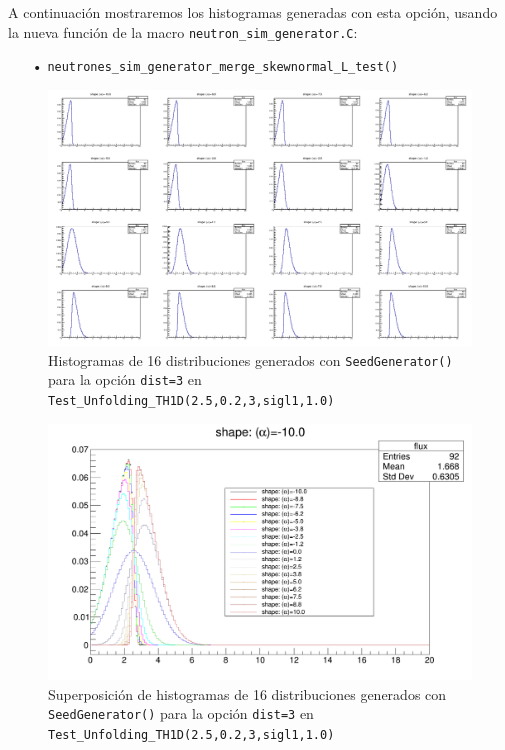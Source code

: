 \documentclass[11pt,letterpaper]{article}
\begin{document}
A continuación mostraremos los histogramas generadas con esta opción, usando la nueva función de la macro \verb|neutron_sim_generator.C|:
\begin{itemize}
\item[•] \verb|neutrones_sim_generator_merge_skewnormal_L_test()|
\end{itemize} 

 \begin{figure}[H]
    \includegraphics[width=1.\textwidth]{img/skew_normal_histogram_test_1.png}
    \centering
     \cprotect\caption{Histogramas de 16 distribuciones generados con \verb|SeedGenerator()| para la opción \verb|dist=3| en \verb|Test_Unfolding_TH1D(2.5,0.2,3,sigl1,1.0)|} 
\label{skew_normal_histogram_test_1}
\end{figure}

 \begin{figure}[H]
    \includegraphics[width=1.\textwidth]{img/skew_normal_histogram_test_2.png}
    \centering
     \cprotect\caption{Superposición de histogramas de 16 distribuciones generados con \verb|SeedGenerator()| para la opción \verb|dist=3| en \verb|Test_Unfolding_TH1D(2.5,0.2,3,sigl1,1.0)|} 
\label{skew_normal_histogram_test_2}
\end{figure}
\end{document}
